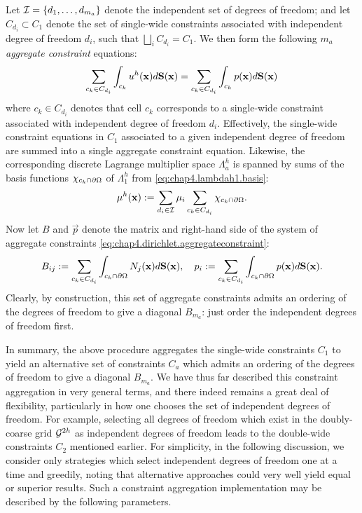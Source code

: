 Let $\mathcal{I} = \left\lbrace  d_1, \dotsc, d_{m_a}  \right\rbrace$ denote the independent set of degrees of freedom; and let $C_{d_i} \subset C_1$ denote the set of single-wide constraints associated with independent degree of freedom $d_i$, such that $\bigsqcup_{i} C_{d_i} = C_1$. We then form the following $m_a$ \emph{aggregate constraint} equations:
\begin{equation} \label{eq:chap4.dirichlet.aggregateconstraint}
\sum_{c_k \in C_{d_i}} \int_{c_k} u^h(\mathbf{x}) d\mathbf{S}(\mathbf{x}) = \sum_{c_k \in C_{d_i}} \int_{c_k} p(\mathbf{x}) d\mathbf{S}(\mathbf{x})
\end{equation}
where $c_k \in C_{d_i}$ denotes that cell $c_k$ corresponds to a single-wide constraint associated with independent degree of freedom $d_i$. Effectively, the single-wide constraint equations in $C_1$ associated to a given independent degree of freedom are summed into a single aggregate constraint equation. Likewise, the corresponding discrete Lagrange multiplier space $\Lambda^h_a$ is spanned by sums of the basis functions $\chi_{c_k \cap \partial\Omega}$ of $\Lambda^h_1$ from \eqref{eq:chap4.lambdah1.basis}:
\begin{equation*}
\mu^h(\mathbf{x}) := \sum_{d_i \in \mathcal{I}} \mu_i \sum_{c_k \in C_{d_i}} \chi_{c_k \cap \partial\Omega}.
\end{equation*}
Now let $B$ and $\vec{p}$ denote the matrix and right-hand side of the system of aggregate constraints \eqref{eq:chap4.dirichlet.aggregateconstraint}:
\begin{equation} \label{eq:chap4.dirichlet.aggregateconstraint.matrix}
B_{ij} := \sum_{c_k \in C_{d_i}} \int_{c_k \cap \partial\Omega} N_j(\mathbf{x}) d\mathbf{S}(\mathbf{x}), \quad p_i := \sum_{c_k \in C_{d_i}} \int_{c_k \cap \partial\Omega} p(\mathbf{x}) d\mathbf{S}(\mathbf{x}).
\end{equation}
Clearly, by construction, this set of aggregate constraints admits an ordering of the degrees of freedom to give a diagonal $B_{m_a}$: just order the independent degrees of freedom first.

In summary, the above procedure aggregates the single-wide constraints $C_1$ to yield an alternative set of constraints $C_a$ which admits an ordering of the degrees of freedom to give a diagonal $B_{m_a}$. We have thus far described this constraint aggregation in very general terms, and there indeed remains a great deal of flexibility, particularly in how one chooses the set of independent degrees of freedom. For example, selecting all degrees of freedom which exist in the doubly-coarse grid $\mathcal{G}^{2h}$ as independent degrees of freedom leads to the double-wide constraints $C_2$ mentioned earlier. For simplicity, in the following discussion, we consider only strategies which select independent degrees of freedom one at a time and greedily, noting that alternative approaches could very well yield equal or superior results. Such a constraint aggregation implementation may be described by the following parameters.

